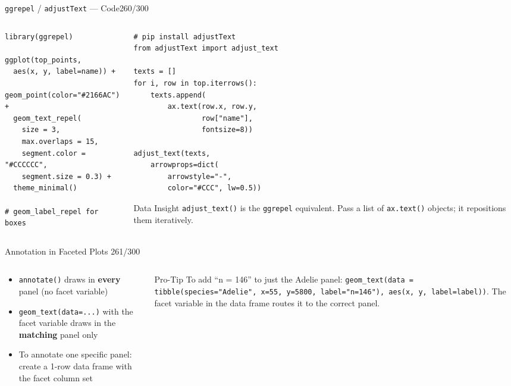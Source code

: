 \documentclass[10pt]{beamer}
\newcommand{\smark}[1]{\hfill{\scriptsize\color{codegray}#1}}
\begin{document}
\begin{frame}[fragile]{\texttt{ggrepel} / \texttt{adjustText} --- Code}\smark{260/300}
\begin{columns}[T]
\begin{column}{0.48\textwidth}
\begin{lstlisting}[style=Rstyle]
library(ggrepel)

ggplot(top_points,
  aes(x, y, label=name)) +
  geom_point(color="#2166AC") +
  geom_text_repel(
    size = 3,
    max.overlaps = 15,
    segment.color = "#CCCCCC",
    segment.size = 0.3) +
  theme_minimal()

# geom_label_repel for boxes
\end{lstlisting}
\end{column}
\begin{column}{0.48\textwidth}
\begin{lstlisting}[style=Pystyle]
# pip install adjustText
from adjustText import adjust_text

texts = []
for i, row in top.iterrows():
    texts.append(
        ax.text(row.x, row.y,
                row["name"],
                fontsize=8))

adjust_text(texts,
    arrowprops=dict(
        arrowstyle="-",
        color="#CCC", lw=0.5))
\end{lstlisting}
\vspace{0.1cm}
\begin{exampleblock}{Data Insight}
    \scriptsize \texttt{adjust\_text()} is the \texttt{ggrepel} equivalent. Pass a list of \texttt{ax.text()} objects; it repositions them iteratively.
\end{exampleblock}
\end{column}
\end{columns}
\end{frame}

\begin{frame}{Annotation in Faceted Plots}
\smark{261/300}
\begin{columns}[T]
\begin{column}{0.50\textwidth}
\begin{itemize}
    \item \texttt{annotate()} draws in \textbf{every} panel (no facet variable)
    \item \texttt{geom\_text(data=...)} with the facet variable draws in the \textbf{matching} panel only
    \item To annotate one specific panel: create a 1-row data frame with the facet column set
\end{itemize}
\end{column}
\begin{column}{0.47\textwidth}
\begin{alertblock}{Pro-Tip}
    \scriptsize To add ``n = 146'' to just the Adelie panel: \texttt{geom\_text(data = tibble(species="Adelie", x=55, y=5800, label="n=146"), aes(x, y, label=label))}. The facet variable in the data frame routes it to the correct panel.
\end{alertblock}
\end{column}
\end{columns}
\end{frame}
\end{document}
